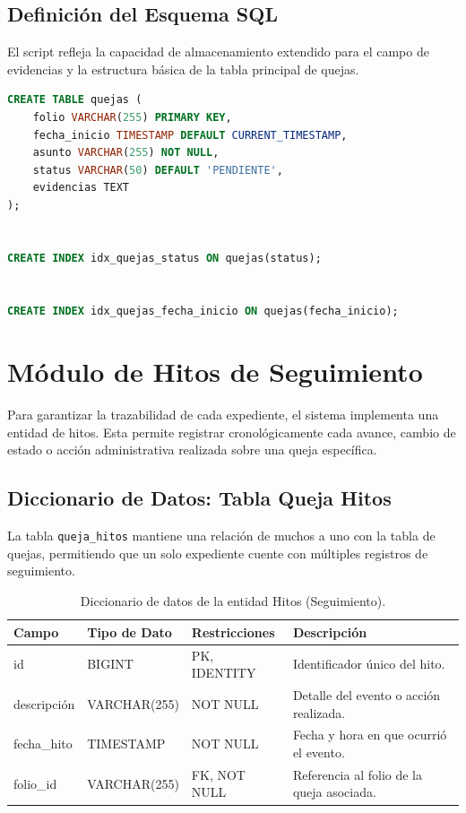 \subsection{Definici\'on del Esquema SQL}
El script refleja la capacidad de almacenamiento extendido para el campo de evidencias y la estructura b\'asica de la tabla principal de quejas.

\begin{lstlisting}[language=SQL, caption={Script de creaci\'on para la tabla de quejas.}, label={lst:sql_quejas}]
CREATE TABLE quejas (
    folio VARCHAR(255) PRIMARY KEY,
    fecha_inicio TIMESTAMP DEFAULT CURRENT_TIMESTAMP,
    asunto VARCHAR(255) NOT NULL,
    status VARCHAR(50) DEFAULT 'PENDIENTE',
    evidencias TEXT
);


CREATE INDEX idx_quejas_status ON quejas(status);


CREATE INDEX idx_quejas_fecha_inicio ON quejas(fecha_inicio);
\end{lstlisting}


\section{M\'odulo de Hitos de Seguimiento}
Para garantizar la trazabilidad de cada expediente, el sistema implementa una entidad de hitos. Esta permite registrar cronol\'ogicamente cada avance, cambio de estado o acci\'on administrativa realizada sobre una queja espec\'ifica.

\subsection{Diccionario de Datos: Tabla Queja Hitos}
La tabla \texttt{queja\_hitos} mantiene una relaci\'on de muchos a uno con la tabla de quejas, permitiendo que un solo expediente cuente con m\'ultiples registros de seguimiento.

\begin{table}[H]
\centering
\small
\begin{tabularx}{\textwidth}{|l|l|l|X|}
\hline
\rowcolor{azulESCOM} 
\color{white}\textbf{Campo} & \color{white}\textbf{Tipo de Dato} & \color{white}\textbf{Restricciones} & \color{white}\textbf{Descripci\'on} \\ \hline
id & BIGINT & PK, IDENTITY & Identificador \'unico del hito. \\ \hline
descripción & VARCHAR(255) & NOT NULL & Detalle del evento o acci\'on realizada. \\ \hline
fecha\_hito & TIMESTAMP & NOT NULL & Fecha y hora en que ocurri\'o el evento. \\ \hline
folio\_id & VARCHAR(255) & FK, NOT NULL & Referencia al folio de la queja asociada. \\ \hline
\end{tabularx}
\caption{Diccionario de datos de la entidad Hitos (Seguimiento).}
\label{tab:dict_hitos}
\end{table}

